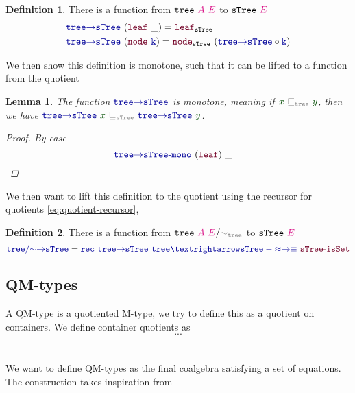 \documentclass[twoside,11pt,openright]{report}
\theoremstyle{plain} %
\newtheorem{lem}[thm]{Lemma}
\theoremstyle{definition}
\newtheorem{defn}{Definition}[section]
\theoremstyle{remark}
\newcommand*{\term}[1]{\textcolor{green!30!black}{#1}} %
\newcommand*{\type}[1]{\textcolor{magenta!90!black}{#1}}
\newcommand*{\relation}[1]{\textcolor{gray}{\ensuremath{\mathtt{#1}}}}
\newcommand*{\function}[1]{\textcolor{blue!60!black}{\ensuremath{\mathtt{#1}}}}
\newcommand*{\constructor}[1]{\textcolor{purple!60!black}{\ensuremath{\mathtt{#1}}}}
\newcommand*{\typeformer}[1]{\ensuremath{\mathtt{#1}}}
\begin{document}
\begin{defn}
  There is a function from \(\typeformer{tree}~\type{A}~\type{E}\) to \(\typeformer{sTree}~\type{E}\)
  \begin{equation}
    \begin{aligned}
      &\function{tree{\rightarrow}sTree}~(\constructor{leaf}~\_) = \constructor{leaf}_{\typeformer{sTree}}\\
      &\function{tree{\rightarrow}sTree}~(\constructor{node}~\function{k}) = \constructor{node}_{\typeformer{sTree}}~(\function{tree{\rightarrow}sTree} \circ \function{k})
    \end{aligned}
  \end{equation}
\end{defn}
We then show this definition is monotone, such that it can be lifted to a function from the quotient
\begin{lem}
  The function \(\function{tree{\rightarrow}sTree}\) is monotone, meaning if \(\term{x}~\relation{\sqsubseteq_{tree}}~\term{y}\), then we have \(\function{tree{\rightarrow}sTree}~\term{x}~\relation{\sqsubseteq_{sTree}}~\function{tree{\rightarrow}sTree}~\term{y}\).
  \begin{proof}
    By case
    \begin{equation}
      \function{tree{\rightarrow}sTree\text{-}mono}~(\constructor{leaf})~\_ = 
    \end{equation}
  \end{proof}
\end{lem}
We then want to lift this definition to the quotient using the recursor for quotients \eqref{eq:quotient-recursor},
\begin{defn}
  There is a function from \(\typeformer{tree}~\type{A}~\type{E} / \relation{\sim_{tree}}\) to \(\typeformer{sTree}~\type{E}\)
  \begin{equation}
    \function{tree/{\sim}{\rightarrow}sTree} = \function{rec}~\function{tree{\rightarrow}sTree}~\function{tree→sTree-{\approx}{\rightarrow}{\equiv}}~\constructor{sTree\text{-}isSet}
  \end{equation}
\end{defn}

\subsection{QM-types}
A QM-type is a quotiented M-type, we try to define this as a quotient on containers. We define container quotients as
\begin{equation}
  ...
\end{equation}
\\ \\
We want to define QM-types as the final coalgebra satisfying a set of equations. The construction takes inspiration from \cite{Infinitary-QIITs}
\end{document}
